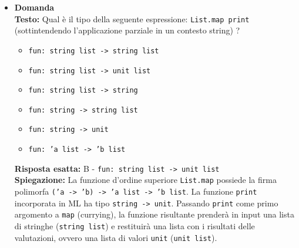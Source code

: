 \documentclass[12pt, a4paper]{article}
\newcounter{domandateoria}
\begin{document}
\begin{itemize}
    \item {}\textbf{Domanda \thedomandateoria} \\
    \textbf{Testo:} Qual è il tipo della seguente espressione: \texttt{List.map print} (sottintendendo l'applicazione parziale in un contesto string) ?
    \begin{itemize}
        \item[A)] \texttt{fun: string list -> string list}
        \item[B)] \texttt{fun: string list -> unit list}
        \item[C)] \texttt{fun: string list -> string}
        \item[D)] \texttt{fun: string -> string list}
        \item[E)] \texttt{fun: string -> unit}
        \item[F)] \texttt{fun: 'a list -> 'b list}
    \end{itemize}
    \textbf{Risposta esatta:} B - \texttt{fun: string list -> unit list} \\
    \textbf{Spiegazione:} La funzione d'ordine superiore \texttt{List.map} possiede la firma polimorfa \texttt{('a -> 'b) -> 'a list -> 'b list}. La funzione \texttt{print} incorporata in ML ha tipo \texttt{string -> unit}. Passando \texttt{print} come primo argomento a \texttt{map} (currying), la funzione risultante prenderà in input una lista di stringhe (\texttt{string list}) e restituirà una lista con i risultati delle valutazioni, ovvero una lista di valori \texttt{unit} (\texttt{unit list}).
    \vspace{0.3cm}


\end{itemize}
\end{document}
